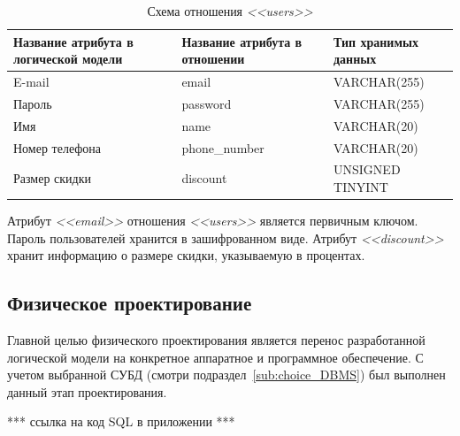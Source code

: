 \begin{table}[h]
  \caption{Схема отношения \textit{<<users>>}}
  \label{tbl:users_scheme}
  \small{
    \centering
    \begin{tabular}{| p{} | p{} | p{} |}
      \hline
      Название атрибута в \newline логической модели &
      Название атрибута в \newline отношении &
      Тип хранимых данных \\

      \hline
      E-mail & email & VARCHAR(255) \\

      \hline
      Пароль & password & VARCHAR(255) \\

      \hline
      Имя & name & VARCHAR(20) \\

      \hline
      Номер телефона & phone\_number & VARCHAR(20) \\

      \hline
      Размер скидки & discount & UNSIGNED TINYINT \\

      \hline
    \end{tabular}
    }
\end{table}

Атрибут \textit{<<email>>} отношения \textit{<<users>>} является первичным ключом.
Пароль пользователей хранится в зашифрованном виде. Атрибут \textit{<<discount>>}
хранит информацию о размере скидки, указываемую в процентах.

\subsection{Физическое проектирование}
\label{sub:db_structure_physical_design}

Главной целью физического проектирования является перенос разработанной логической модели
на конкретное аппаратное и программное обеспечение. С учетом выбранной СУБД (смотри
подраздел~\ref{sub:choice_DBMS}) был выполнен данный этап проектирования.

*** ссылка на код SQL в приложении ***
\pagebreak
